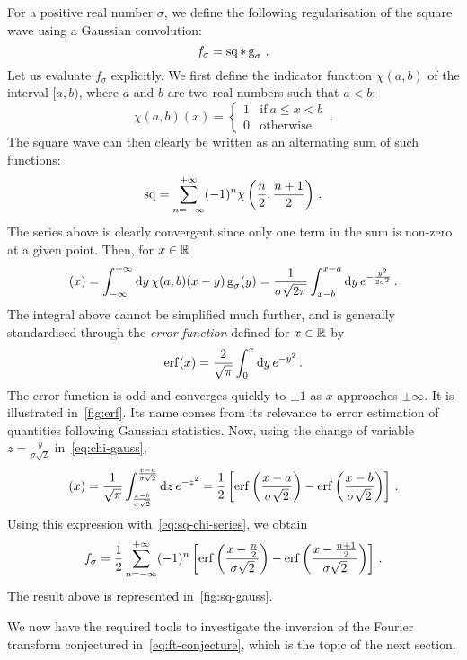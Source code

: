 \begin{example}
  For a positive real number $\sigma$, we define the following regularisation of the
  square wave using a Gaussian convolution:
  \begin{equation}
    f_\sigma=\operatorname{sq}\ast\operatorname{g}_\sigma\,.\label{eq:sq-gauss}
  \end{equation}
  Let us evaluate $f_\sigma$ explicitly. We first define the indicator function
  $\chi(a,b)$ of the interval $[a,b)$, where $a$ and $b$ are two real numbers such that
  $a<b$:
  \begin{equation}
    \chi(a,b)(x)=
    \begin{cases}
      1&\text{if}~a\leq x<b\\
      0&\text{otherwise}
    \end{cases}\,.
  \end{equation}
  The square wave can then clearly be written as an alternating sum of such functions:
  \begin{equation}
    \operatorname{sq}=\sum_{n=-\infty}^{+\infty}(-1)^{n}\chi\left(\frac{n}{2},\frac{n+1}{2}\right)\,.
    \label{eq:sq-chi-series}
  \end{equation}
  The series above is clearly convergent since only one term in the sum is non-zero at a
  given point. Then, for $x\in\mathbb{R}$
  \begin{equation}
    [\chi(a,b)\ast\gauss_\sigma](x)=\intr{y}\chi(a,b)(x-y)\gauss_\sigma(y)
    =\frac{1}{\sigma\sqrt{2\pi}}\int_{x-b}^{x-a}\diff y\,e^{-\frac{y^2}{2\sigma^2}}\,.
    \label{eq:chi-gauss}
  \end{equation}
  The integral above cannot be simplified much further, and is generally standardised
  through the \emph{error function} defined for $x\in\mathbb{R}$ by
  \begin{equation}
    \operatorname{erf}(x)=\frac{2}{\sqrt{\pi}}\int_0^x\mathrm{d} y\,e^{-y^2}\,.\label{eq:erf}
  \end{equation}
  The error function is odd and converges quickly to $\pm 1$ as $x$ approaches
  $\pm\infty$. It is illustrated in~\cref{fig:erf}. Its name comes from its relevance to
  error estimation of quantities following Gaussian statistics. Now, using the change of
  variable $z=\frac{y}{\sigma\sqrt{2}}$ in~\cref{eq:chi-gauss},
  \begin{equation}
    [\chi(a,b)\ast\gauss_\sigma](x)=\frac{1}{\sqrt{\pi}}
    \int_{\frac{x-b}{\sigma\sqrt{2}}}^{\frac{x-a}{\sigma\sqrt{2}}}\diff z\,e^{-z^2}
    =\frac{1}{2}\left[\erf\left(\frac{x-a}{\sigma\sqrt{2}}\right)
    -\erf\left(\frac{x-b}{\sigma\sqrt{2}}\right)\right]\,.
  \end{equation}
  Using this expression with~\cref{eq:sq-chi-series}, we obtain
  \begin{equation}
    f_\sigma=\frac{1}{2}\sum_{n=-\infty}^{+\infty}(-1)^{n}
    \left[\operatorname{erf}\bigg(\frac{x-\frac{n}{2}}{\sigma\sqrt{2}}\bigg)
    -\operatorname{erf}\bigg(\frac{x-\frac{n+1}{2}}{\sigma\sqrt{2}}\bigg)\right]\,.
    \label{eq:sq-gauss-exp}
  \end{equation}
  The result above is represented in~\cref{fig:sq-gauss}.
\end{example}
We now have the required tools to investigate the inversion of the Fourier transform
conjectured in~\cref{eq:ft-conjecture}, which is the topic of the next section.
